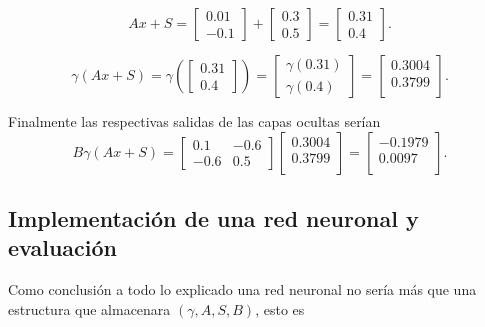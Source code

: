 \begin{equation}
    A x +S= 
    \begin{bmatrix}
        0.01  \\
        -0.1 
    \end{bmatrix}
    + 
    \begin{bmatrix}
        0.3  \\
        0.5 
    \end{bmatrix}
    = 
    \begin{bmatrix}
        0.31  \\
        0.4 
    \end{bmatrix}
    . 
\end{equation}

\begin{equation}
    \gamma (A x +S) = 
    \gamma \left(
    \begin{bmatrix}
        0.31  \\
        0.4 
    \end{bmatrix}
    \right)
    = 
    \begin{bmatrix}
        \gamma(0.31)  \\
        \gamma(0.4) 
    \end{bmatrix}
    = 
    \begin{bmatrix}
        0.3004 \\
        0.3799  \\
    \end{bmatrix}.
\end{equation}

Finalmente las respectivas salidas de las capas ocultas serían
\begin{equation}
    B  \gamma (A x +S)  
    = 
    \begin{bmatrix}
        0.1 & -0.6 \\
        -0.6 & 0.5
    \end{bmatrix}
    \begin{bmatrix}
        0.3004 \\
        0.3799  \\
    \end{bmatrix}
    = 
    \begin{bmatrix}
        -0.1979 \\
       0.0097  \\
    \end{bmatrix}.
\end{equation}

\subsection{Implementación de una red neuronal y evaluación}
\label{section:rrnn_implementation}
Como conclusión a todo lo explicado una red neuronal no 
sería más que una estructura que almacenara $(\gamma, A, S, B)$, esto es 

